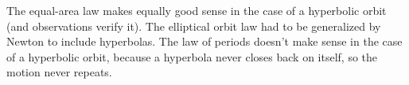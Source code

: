 The equal-area law makes equally good sense in the case of
 a hyperbolic orbit (and observations verify it). The
elliptical orbit law had to be generalized by Newton to include
 hyperbolas. The law of periods doesn't make sense
in the case of a hyperbolic orbit, because a hyperbola never closes
 back on itself, so the motion never repeats.




